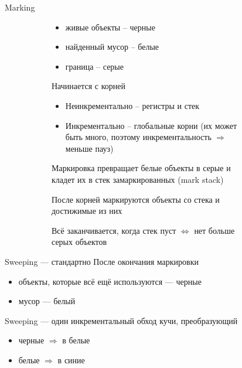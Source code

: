 \documentclass[aspectratio=169
  , xcolor={svgnames} 
  , hyperref={ colorlinks,citecolor=DeepPink4
             , linkcolor=DarkRed,urlcolor=DarkBlue}
  , russian
  ]{beamer}
\theoremstyle{exerciseStyle1}
\begin{document}
\begin{frame}{Marking}

\begin{figure}[ht]
\begin{subfigure}{.49\textwidth}
\begin{itemize}
  \item живые объекты -- черные
  \item найденный мусор -- белые
  \item граница -- серые
\end{itemize}
Начинается с корней
\begin{itemize}
\item Неинкрементально -- регистры и стек
\item Инкрементально -- глобальные корни (их может быть много, поэтому инкрементальность $\Rightarrow$ меньше пауз)
\end{itemize}
\end{subfigure}
\begin{subfigure}{.49\textwidth}
Маркировка превращает белые объекты в серые  и кладет их в стек замаркированных (mark stack) \vspace{.5cm}

После корней маркируются объекты со стека и достижимые из них \vspace{.5cm}

Всё заканчивается, когда стек пуст $\Leftrightarrow$ нет больше серых объектов


\end{subfigure}
\end{figure}
\end{frame}

\begin{frame}{Sweeping --- стандартно}
После окончания маркировки
\begin{itemize}
\item объекты, которые всё ещё используются --- черные 
\item мусор --- белый
\end{itemize}

Sweeping --- один инкрементальный обход кучи, преобразующий 
\begin{itemize}
\item черные $\Rightarrow$ в белые
\item белые $\Rightarrow$ в синие
\end{itemize}
 

\end{frame}
\end{document}
